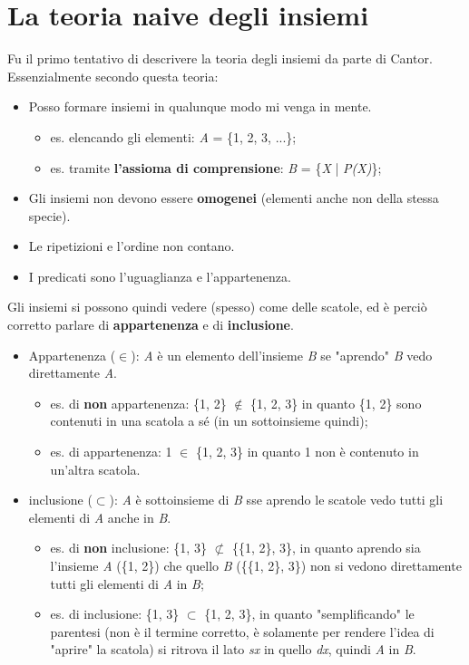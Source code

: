 \documentclass[12pt]{article}
\begin{document}
\section{La teoria naive degli insiemi}
Fu il primo tentativo di descrivere la teoria degli insiemi da parte di Cantor.\\
Essenzialmente secondo questa teoria:
\begin{itemize}
    \item Posso formare insiemi in qualunque modo mi venga in mente.
    \begin{itemize}
        \item es. elencando gli elementi: \textit{A} = \{1, 2, 3, ...\};
        \item es. tramite \textbf{l'assioma di comprensione}: \textit{B} = \{\textit{X} | \textit{P(X)}\};  
    \end{itemize}
    \item Gli insiemi non devono essere \textbf{omogenei} (elementi anche non della stessa specie).
    \item Le ripetizioni e l'ordine non contano.
    \item I predicati sono l'uguaglianza e l'appartenenza.
\end{itemize}
Gli insiemi si possono quindi vedere (spesso) come delle scatole, ed è perciò corretto parlare di \textbf{appartenenza} e di \textbf{inclusione}.
\begin{itemize}
    \item Appartenenza ($\in$): \textit{A} è un elemento dell'insieme \textit{B} se "aprendo" \textit{B} vedo direttamente \textit{A}.
    \begin{itemize}
        \item es. di \textbf{non} appartenenza: \{1, 2\} $\notin$ \{1, 2, 3\} in quanto \{1, 2\} sono contenuti in una scatola a sé (in un sottoinsieme quindi);
        \item es. di appartenenza: 1 $\in$ \{1, 2, 3\} in quanto 1 non è contenuto in un'altra scatola.
    \end{itemize}
    \item inclusione ($\subset$): \textit{A} è sottoinsieme di \textit{B} sse aprendo le scatole vedo tutti gli elementi di \textit{A} anche in \textit{B}.
    \begin{itemize}
        \item es. di \textbf{non} inclusione: \{1, 3\} $\not \subset$ \{\{1, 2\}, 3\}, in quanto aprendo sia l'insieme \textit{A} (\{1, 2\}) che quello \textit{B} (\{\{1, 2\}, 3\}) non si vedono direttamente tutti gli elementi di \textit{A} in \textit{B};
        \item es. di inclusione: \{1, 3\} $\subset$ \{1, 2, 3\}, in quanto "semplificando" le parentesi (non è il termine corretto, è solamente per rendere l'idea di "aprire" la scatola) si ritrova il lato \textit{sx} in quello \textit{dx}, quindi \textit{A} in \textit{B}.
    \end{itemize} 
\end{itemize}
\end{document}
